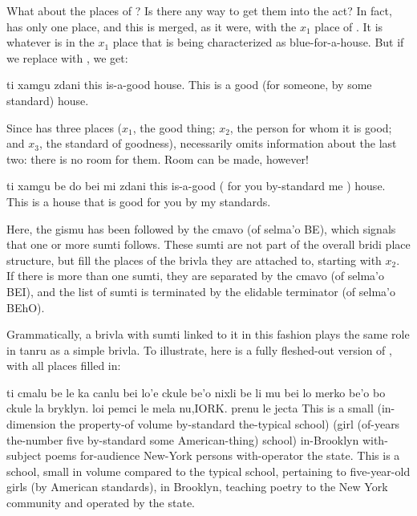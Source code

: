 What about the places of ? Is there any way to get
    them into the act? In fact,  has only one place, and
    this is merged, as it were, with the $x_1$ place of . It
    is whatever is in the $x_1$ place that is being characterized as
    blue-for-a-house. But if we replace  with ,
    we get:
\begin{example}
ti xamgu zdani\n
this is-a-good house.\n
This is a good (for someone, by some standard) house.
\end{example}

Since  has three places ($x_1$, the good thing; $x_2$,
    the person for whom it is good; and $x_3$, the standard of
    goodness),  necessarily omits
    information about the last two: there is no room for them. Room
    can be made, however!
\begin{example}
ti xamgu be do bei mi  zdani\n
this is-a-good ( for you by-standard me ) house.\n
This is a house that is good for you by my standards.
\end{example}

Here, the gismu  has been followed by the cmavo 
    (of selma'o BE), which signals that one or more sumti follows.
    These sumti are not part of the overall bridi place structure,
    but fill the places of the brivla they are attached to,
    starting with $x_2$. If there is more than one sumti, they are
    separated by the cmavo  (of selma'o BEI), and the list
    of sumti is terminated by the elidable terminator  (of
    selma'o BEhO). 

Grammatically, a brivla with sumti linked to it in this
    fashion plays the same role in tanru as a simple brivla. To
    illustrate, here is a fully fleshed-out version of , with all places filled in:
\begin{example}
ti cmalu be le ka canlu\n
\T	\T	bei lo'e ckule be'o\n
\T	nixli be li mu\n
\T	\T	bei lo merko be'o bo\n
\T	ckule la bryklyn. loi pemci\n
\T	\T	le mela nu,IORK. prenu\n
\T	\T	le jecta\n
This is a small (in-dimension the property-of volume\n
\T	\T	by-standard the-typical school)\n
\T	(girl (of-years the-number five\n
\T	\T	by-standard some American-thing)\n
\T	school) in-Brooklyn with-subject poems\n
\T	\T	for-audience New-York persons\n
\T	\T	with-operator the state.\n
This is a school, small in volume compared to the\n
\T	typical school, pertaining to five-year-old\n
\T	girls (by American standards), in Brooklyn,\n
\T	teaching poetry to the New York community\n
\T	and operated by the state.
\end{example}

